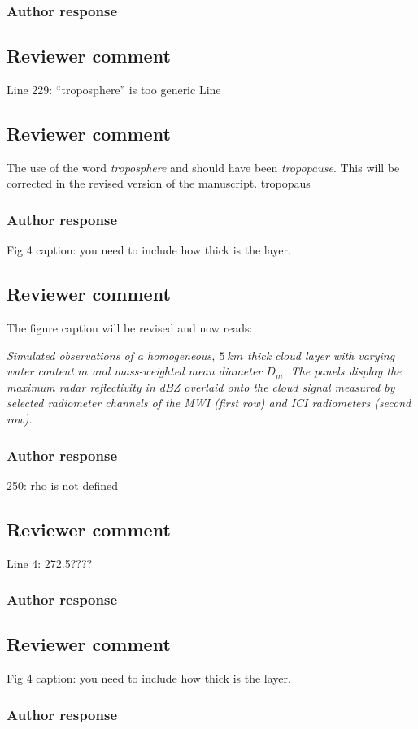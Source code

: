 \documentclass[11pt]{scrartcl}
\begin{document}
\subsubsection*{Author response}

\subsection*{Reviewer comment}
Line 229: “troposphere” is too generic Line

\subsection*{Reviewer comment}

The use of the word {\itshape troposphere} and should have been {\itshape tropopause}.
This will be corrected in the revised version of the manuscript.
tropopaus


\subsubsection*{Author response}
Fig 4 caption: you need to include how thick is the layer.

\subsection*{Reviewer comment}

The figure caption will be revised and now reads:

{\itshape Simulated observations of a homogeneous, $5\ \unit{km}$ thick cloud
  layer with varying water content $m$ and mass-weighted mean diameter $D_m$.
  The panels display the maximum radar reflectivity in dBZ overlaid onto the
  cloud signal measured by selected radiometer channels of the MWI (first row)
  and ICI radiometers (second row).}

\subsubsection*{Author response}
250: rho is not defined

\subsection*{Reviewer comment}
Line 4: 272.5????

\subsubsection*{Author response}

\subsection*{Reviewer comment}
Fig 4 caption: you need to include how thick is the layer.

\subsubsection*{Author response}



\end{document}
